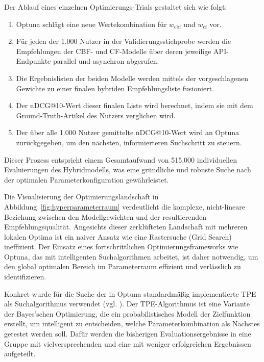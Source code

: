 Der Ablauf eines einzelnen Optimierungs-Trials gestaltet sich wie folgt:
\begin{enumerate}
    \item Optuna schlägt eine neue Wertekombination für $w_\mathrm{cbf}$ und $w_\mathrm{cf}$ vor.
    \item Für jeden der 1.000 Nutzer in der Validierungsstichprobe werden die Empfehlungen der 
    \ac{CBF}- und \ac{CF}-Modelle über deren jeweilige API-Endpunkte parallel und asynchron abgerufen.
    \item Die Ergebnislisten der beiden Modelle werden mittels der vorgeschlagenen Gewichte zu einer 
    finalen hybriden Empfehlungsliste fusioniert.
    \item Der nDCG@10-Wert dieser finalen Liste wird berechnet, indem sie mit dem Ground-Truth-Artikel 
    des Nutzers verglichen wird.
    \item Der über alle 1.000 Nutzer gemittelte nDCG@10-Wert wird an Optuna zurückgegeben, um 
    den nächsten, informierteren Suchschritt zu steuern.
\end{enumerate}

Dieser Prozess entspricht einem Gesamtaufwand von 515.000 individuellen Evaluierungen des 
Hybridmodells, was eine gründliche und robuste Suche nach der optimalen Parameterkonfiguration 
gewährleistet.

Die Visualisierung der Optimierungslandschaft in Abbildung~\ref{fig:hyperparameterraum} verdeutlicht die 
komplexe, nicht-lineare Beziehung zwischen den Modellgewichten und der resultierenden Empfehlungsqualität. 
Angesichts dieser zerklüfteten Landschaft mit mehreren lokalen Optima ist ein naiver Ansatz wie eine 
Rastersuche (Grid Search) ineffizient. Der Einsatz eines fortschrittlichen Optimierungsframeworks 
wie Optuna, das mit intelligenten Suchalgorithmen arbeitet, ist daher notwendig, um den global 
optimalen Bereich im Parameterraum effizient und verlässlich zu identifizieren.



Konkret wurde für die Suche der in Optuna standardmäßig implementierte \ac{TPE} als Suchalgorithmus verwendet (vgl. \cite{Akiba_Optuna_2019}). Der TPE-Algorithmus ist eine 
Variante der Bayes'schen Optimierung, die ein probabilistisches Modell der Zielfunktion erstellt, 
um intelligent zu entscheiden, welche Parameterkombination als Nächstes getestet werden soll. 
Dafür werden die bisherigen Evaluationsergebnisse in eine Gruppe mit vielversprechenden
und eine mit weniger erfolgreichen Ergebnissen aufgeteilt.

